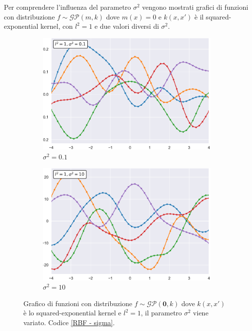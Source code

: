 Per comprendere l'influenza del parametro $\sigma^2$ vengono mostrati grafici di funzioni con distribuzione $f\sim \mathcal{GP}(m,k)$ dove $m(x)=0$ e $k(x,x')$ è il squared-exponential kernel, con $l^2=1$ e due valori diversi di $\sigma^2$.
\begin{figure}[h]
\centering
\begin{subfigure}{.5\textwidth}
  \centering
  \includegraphics[width=\linewidth]{images/Gaussian process/RBF - sigma=01.pdf}
  \caption{$\sigma^2=0.1$}
\end{subfigure}%
\begin{subfigure}{.5\textwidth}
  \centering
  \includegraphics[width=\linewidth]{images/Gaussian process/RBF - sigma=10.pdf}
  \caption{$\sigma^2=10$}
\end{subfigure}
\caption{Grafico di funzioni con distribuzione $f\sim \mathcal{GP}(\bm{0},k)$ dove $k(x,x')$ è lo squared-exponential kernel e $l^2=1$, il parametro $\sigma^2$ viene variato. Codice \ref{RBF - sigma}.}
\label{10 sample exponential modified sigma}
\end{figure}

